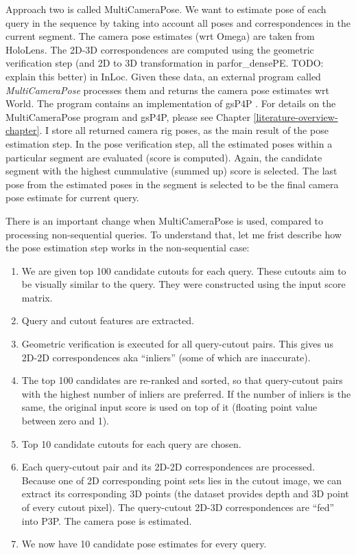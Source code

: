 \documentclass[twoside]{ctuthesis}
\theoremstyle{plain}
\theoremstyle{definition}
\theoremstyle{note}
\newcommand{\topRetrieval}{100} %
\newcommand{\topGV}{10} %
\newcommand{\topPE}{10} %
\begin{document}
Approach two is called MultiCameraPose. We want to estimate pose of each query in the sequence by taking into account all poses and correspondences in the current segment. The camera pose estimates (wrt Omega) are taken from HoloLens. The 2D-3D correspondences are computed using the geometric verification step (and 2D to 3D transformation in parfor\_densePE. TODO: explain this better) in InLoc. Given these data, an external program called \emph{MultiCameraPose} \cite{MultiCameraPose} processes them and returns the camera pose estimates wrt World. The program contains an implementation of gsP4P \cite{Kukelova2016CVPR}. For details on the MultiCameraPose program and gsP4P, please see Chapter \ref{literature-overview-chapter}. I store all returned camera rig poses, as the main result of the pose estimation step. In the pose verification step, all the estimated poses within a particular segment are evaluated (score is computed). Again, the candidate segment with the highest cummulative (summed up) score is selected. The last pose from the estimated poses in the segment is selected to be the final camera pose estimate for current query.

There is an important change when MultiCameraPose is used, compared to processing non-sequential queries. To understand that, let me frist describe how the pose estimation step works in the non-sequential case:

\begin{enumerate}
	\item We are given top \topRetrieval{} candidate cutouts for each query. These cutouts aim to be visually similar to the query. They were constructed using the input score matrix.
	\item Query and cutout features are extracted.
	\item Geometric verification is executed for all query-cutout pairs. This gives us 2D-2D correspondences aka ``inliers'' (some of which are inaccurate).
	\item \label{item:GV-reranking} The top \topRetrieval{} candidates are re-ranked and sorted, so that query-cutout pairs with the highest number of inliers are preferred. If the number of inliers is the same, the original input score is used on top of it (floating point value between zero and 1).
	\item \label{item:topGV} Top \topGV{} candidate cutouts for each query are chosen.
	\item Each query-cutout pair and its 2D-2D correspondences are processed. Because one of 2D corresponding point sets lies in the cutout image, we can extract its corresponding 3D points (the dataset provides depth and 3D point of every cutout pixel). The query-cutout 2D-3D correspondences are ``fed'' into P3P. The camera pose is estimated.
	\item We now have \topPE{} candidate pose estimates for every query.
\end{enumerate}
\end{document}
